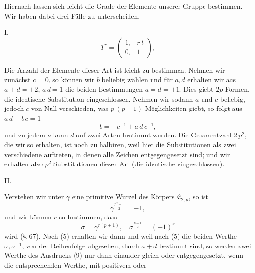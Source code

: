 Hiernach lassen sich leicht die Grade der Elemente unserer
Gruppe bestimmen. Wir haben dabei drei Fälle zu unterscheiden.

I.~ 
\[
T^r = \begin{pmatrix} 1, & r\,t \\ 0, & 1 \end{pmatrix},
\]

Die Anzahl der Elemente dieser Art ist leicht zu bestimmen.
Nehmen wir zunächst $c = 0$, so können wir $b$ beliebig wählen
und für $a, d$ erhalten wir aus $a + d = \pm 2$, $a\,d = 1$ die beiden
Bestimmungen $a = d = \pm 1$. Dies giebt $2p$ Formen, die identische
 Substitution eingeschlossen. Nehmen wir sodann $a$ und $c$
beliebig, jedoch $c$ von Null verschieden, was $p\,(p-1)$ Möglichkeiten
 giebt, so folgt aus $a\,d - b\,c = 1$
\[
b = -c^{-1} + a\,d\,c^{-1},
\]
und zu jedem $a$ kann $d$ auf zwei Arten bestimmt werden. Die
Gesammtzahl $2\,p^2$, die wir so erhalten, ist noch zu halbiren, weil
hier die Substitutionen als zwei verschiedene auftreten, in denen
alle Zeichen entgegengesetzt sind; und wir erhalten also $p^2$ Substitutionen
 dieser Art (die identische eingeschlossen).

II.~

Verstehen wir unter $\gamma$ eine primitive Wurzel des Körpers
$\mathfrak{E}_{2,p}$, so ist
\[
\gamma^{\frac{p^2-1}{2}} = -1,
\]
und wir können $r$ so bestimmen, dass
\[
\sigma = \gamma^{r(p+1)}, \quad \sigma^{\frac{p-1}{2}} = (-1)^r
\]
wird (\S.\,67). Nach (5) erhalten wir dann
und weil nach (5) die beiden Werthe $\sigma, \sigma^{-1}$, von der Reihenfolge
abgesehen, durch $a+d$ bestimmt sind, so werden zwei Werthe
des Ausdrucks (9) nur dann einander gleich oder entgegengesetzt,
wenn die entsprechenden Werthe, mit positivem oder
